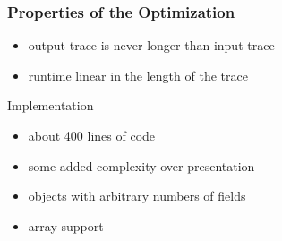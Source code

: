 \documentclass[utf8x]{beamer}
\begin{document}
\begin{frame}
  \frametitle{Properties of the Optimization}
  \begin{itemize}
      \item output trace is never longer than input trace
      \item runtime linear in the length of the trace
  \end{itemize}
  \pause
  \begin{block}{Implementation}
      \begin{itemize}
          \item about 400 lines of code
          \item some added complexity over presentation
          \item objects with arbitrary numbers of fields
          \item array support
      \end{itemize}
  \end{block}
\end{frame}
\end{document}
